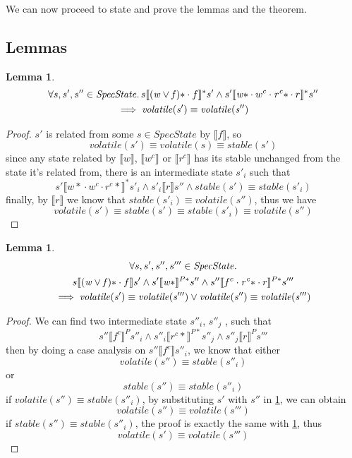 \documentclass[a4paper,11pt]{article}
\newtheorem{lemma}[theorem]{Lemma}
\theoremstyle{definition}
\begin{document}
We can now proceed to state and prove the lemmas and the theorem.

\subsection{Lemmas}

\begin{lemma}\label{lemma-2-1}
\begin{multline*}
	\forall s, s', s'' \in \mathit{SpecState} \ldotp s \llbracket \mathit{(w \lor f)\ast} \cdot f \rrbracket^* s' \land s' \llbracket \mathit{w\ast} \cdot w^c \cdot \mathit{r^c\ast} \cdot r \rrbracket^* s'' \\
	  \implies \mathit{volatile(s')} \equiv \mathit{volatile(s'')}
\end{multline*}
\end{lemma}
\begin{proof}
	$s'$ is related from some $s \in \mathit{SpecState}$ by $\llbracket f \rrbracket$, so
		$$\mathit{volatile(s')} \equiv \mathit{volatile(s)} \equiv \mathit{stable(s')}$$
	since any state related by $\llbracket w \rrbracket$, $\llbracket w^c \rrbracket$ or $\llbracket r^c \rrbracket$ has its stable unchanged from the state it's related from, there is an intermediate state $s'_i$ such that
		$$s' \llbracket {w*} \cdot w^c \cdot {r^c *} \rrbracket^* s'_i \land s'_i \llbracket r \rrbracket s'' \land stable(s') \equiv stable(s'_i)$$
	finally, by $\llbracket r \rrbracket$ we know that $\mathit{stable(s'_i) \equiv volatile(s'')}$, thus we have
		$$\mathit{volatile(s') \equiv stable(s') \equiv stable(s'_i) \equiv volatile(s'')}$$
\end{proof}

\begin{lemma}\label{lemma-2-2}
\begin{multline*}
      \forall s, s', s'', s''' \in \mathit{SpecState} \ldotp \\
      s \llbracket \mathit{(w \lor f)\ast} \cdot f \rrbracket s' \land
	  s' \llbracket \mathit{w\ast} \rrbracket^{P*} s'' \land
	  s'' \llbracket f^c \cdot \mathit{r^c\ast} \cdot r \rrbracket^{P*} s'''\\ \implies \mathit{volatile(s')} \equiv \mathit{volatile(s''')} \lor \mathit{volatile(s'')} \equiv \mathit{volatile(s''')}
\end{multline*}
\end{lemma}
\begin{proof}
	We can find two intermediate state $s''_i$, $s''_j$ , such that $$s'' \llbracket f^c \rrbracket^P s''_i \land s''_i \llbracket r^c* \rrbracket^{P*} s''_j \land s''_j \llbracket r \rrbracket^P s'''$$
	then by doing a case analysis on $s'' \llbracket f^c \rrbracket s''_i$, we know that either $$\mathit{volatile(s'') \equiv stable(s''_i)}$$ or $$\mathit{stable(s'') \equiv stable(s''_i)}$$
	if $\mathit{volatile(s'') \equiv stable(s''_i)}$, by substituting $s'$ with $s''$ in
	\cref{lemma-2-1}, we can obtain $$\mathit{volatile(s'') \equiv volatile(s''')}$$
	if $\mathit{stable(s'') \equiv stable(s''_i)}$, the proof is exactly the same with \cref{lemma-2-1}, thus $$\mathit{volatile(s') \equiv volatile(s''')}$$
\end{proof}
\end{document}
